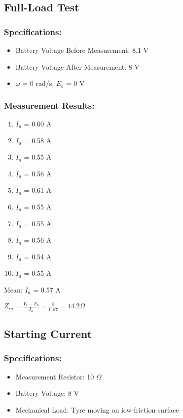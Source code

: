 \documentclass[10pt,a4paper]{article}
\begin{document}
\subsection{Full-Load Test}
\subsubsection{Specifications:}
\begin{itemize}
\item Battery Voltage Before Measurement: 8.1 V
\item Battery Voltage After Measurement: 8 V
\item $\omega$ = 0 rad/s, $E_{b}$ = 0 V
\end{itemize}
\subsubsection{Measurement Results:}
\begin{enumerate}
\item $I_{a}$ = 0.60 A
\item $I_{a}$ = 0.58 A
\item $I_{a}$ = 0.55 A
\item $I_{a}$ = 0.56 A
\item $I_{a}$ = 0.61 A
\item $I_{a}$ = 0.55 A
\item $I_{a}$ = 0.55 A
\item $I_{a}$ = 0.56 A
\item $I_{a}$ = 0.54 A
\item $I_{a}$ = 0.55 A
\end{enumerate}
Mean: $I_{a}$ = 0.57 A
\vspace{0.5 cm}

$Z_{in} = \frac{V_t - E_b}{I_a} = \frac{8}{0.57} = 14.2 \Omega$

\subsection{Starting Current}
\subsubsection{Specifications:}
\begin{itemize}
\item Measurement Resistor: 10 $\Omega$
\item Battery Voltage: 8 V
\item Mechanical Load: Tyre moving on low-friction-surface
\end{itemize}
\end{document}

